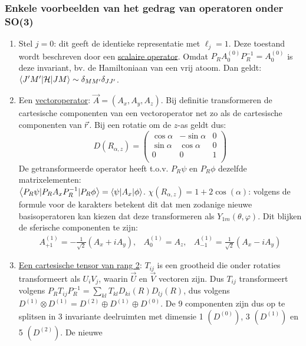 \documentclass[twoside]{report}
\begin{document}
\subsubsection{Enkele voorbeelden van het gedrag van operatoren onder SO(3)}
\begin{enumerate}
\item Stel $j=0$: dit geeft de identieke representatie met $\ell_j=1$. Deze
      toestand wordt beschreven door een \underline{scalaire operator}. Omdat
      $P_RA^{(0)}_0P_R^{-1}=A_0^{(0)}$ is deze invariant, bv. de Hamiltoniaan
      van een vrij atoom. Dan geldt: $\left\langle J'M'|{\cal{H}}|JM \right\rangle\sim\delta_{MM'}\delta_{JJ'}$.
\item Een \underline{vectoroperator}: $\vec{A}=(A_x,A_y,A_z)$. Bij definitie transformeren
      de cartesische componenten van een vectoroperator net zo als de
      cartesische componenten van $\vec{r}$. Bij een rotatie om de $z$-as geldt
      dus:
      \[
      D(R_{\alpha,z})=\left(\begin{array}{ccc}
                      \cos\alpha&-\sin\alpha&0\\
                      \sin\alpha& \cos\alpha&0\\
                      0&0&1\\
                      \end{array}\right)
      \]
      De getransformeerde operator heeft t.o.v. $P_R\psi$ en $P_R\phi$ dezelfde
      matrixelementen:\\
      $\left\langle P_R\psi|P_RA_xP_R^{-1}|P_R\phi \right\rangle=\left\langle \psi|A_x|\phi \right\rangle$.
      $\chi(R_{\alpha,z})=1+2\cos(\alpha)$: volgens de formule voor de karakters
      betekent dit dat men zodanige nieuwe basisoperatoren kan kiezen
      dat deze transformeren als $Y_{1m}(\theta,\varphi)$. Dit blijken de
      sferische componenten te zijn:
      \begin{eqnarray*}
      A^{(1)}_{+1}=-\frac{1}{\sqrt{2}}(A_x+iA_y),&A^{(1)}_0=A_z,&A^{(1)}_{-1}=\frac{1}{\sqrt{2}}(A_x-iA_y)
      \end{eqnarray*}
\item \underline{Een cartesische tensor van rang 2}: $T_{ij}$ is een grootheid
      die onder rotaties transformeert als $U_iV_j$, waarin $\vec{U}$ en $\vec{V}$
      vectoren zijn. Dus $T_{ij}$ transformeert volgens
      $P_RT_{ij}P_R^{-1}=\sum\limits_{kl}T_{kl}D_{ki}(R)D_{lj}(R)$, dus volgens
      $D^{(1)}\otimes D^{(1)}= D^{(2)}\oplus D^{(1)}\oplus D^{(0)}$.
      De 9 componenten zijn dus op te splitsen in 3 invariante deelruimten met
      dimensie 1 $(D^{(0)})$, 3 $(D^{(1)})$ en 5 $(D^{(2)})$. De nieuwe

\end{enumerate}
\end{document}
